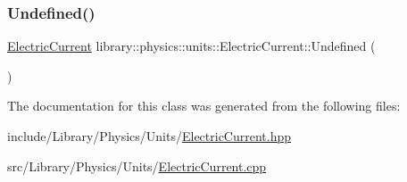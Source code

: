 \mbox{\label{classlibrary_1_1physics_1_1units_1_1_electric_current_ae7de29cf2987692918a092a9fcbf209f}} 
\subsubsection{\texorpdfstring{Undefined()}{Undefined()}}
{\footnotesize\ttfamily \hyperlink{classlibrary_1_1physics_1_1units_1_1_electric_current}{Electric\+Current} library\+::physics\+::units\+::\+Electric\+Current\+::\+Undefined (\begin{DoxyParamCaption}{ }\end{DoxyParamCaption})\hspace{0.3cm}{\ttfamily [static]}}



The documentation for this class was generated from the following files\+:\begin{DoxyCompactItemize}
\item 
include/\+Library/\+Physics/\+Units/\hyperlink{_electric_current_8hpp}{Electric\+Current.\+hpp}\item 
src/\+Library/\+Physics/\+Units/\hyperlink{_electric_current_8cpp}{Electric\+Current.\+cpp}\end{DoxyCompactItemize}
